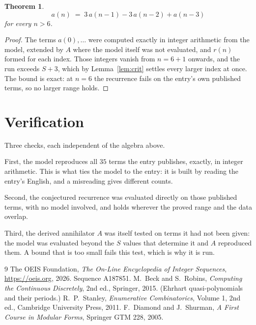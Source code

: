 \documentclass[11pt,a4paper]{article}
\theoremstyle{plain}
\newtheorem{theorem}{Theorem}
\theoremstyle{definition}
\begin{document}
\begin{theorem}
\[
a(n)\;=\;3\,a(n-1) - 3\,a(n-2) + a(n-3)
\]
for every $n>6$.
\end{theorem}

\begin{proof}
The terms $a(0),\dots$ were computed exactly in integer arithmetic from the model, extended by
$A$ where the model itself was not evaluated, and $r(n)$ formed for each index. Those integers
vanish from $n=6+1$ onwards, and the run exceeds $S+3$, which by
Lemma~\ref{lem:crit} settles every larger index at once. The bound is exact: at $n=6$ the recurrence fails on the entry's own published terms, so no larger range holds.
\end{proof}

\section{Verification}

Three checks, each independent of the algebra above.

First, the model reproduces all $35$ terms the entry publishes, exactly, in integer
arithmetic. This is what ties the model to the entry: it is built by reading the entry's
English, and a misreading gives different counts.

Second, the conjectured recurrence was evaluated directly on those published terms, with no
model involved, and holds wherever the proved range and the data overlap.

Third, the derived annihilator $A$ was itself tested on terms it had not been given: the model
was evaluated beyond the $S$ values that determine it and $A$ reproduced them. A bound that is
too small fails this test, which is why it is run.

\begin{thebibliography}{9}
 The OEIS Foundation, \emph{The On-Line Encyclopedia of Integer
Sequences}, \url{https://oeis.org}, 2026. Sequence A187851.
 M.~Beck and S.~Robins, \emph{Computing the Continuous Discretely},
2nd ed., Springer, 2015. (Ehrhart quasi-polynomials and their periods.)
 R.~P.~Stanley, \emph{Enumerative Combinatorics}, Volume 1, 2nd ed.,
Cambridge University Press, 2011.
 F.~Diamond and J.~Shurman, \emph{A First Course in Modular Forms},
Springer GTM 228, 2005.
\end{thebibliography}
\end{document}
